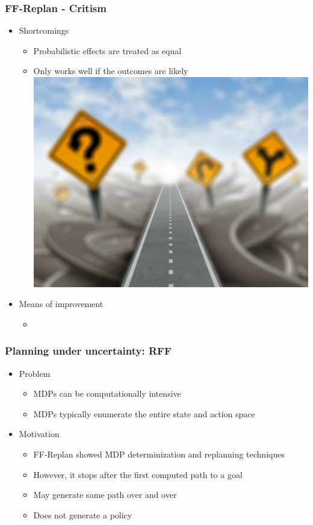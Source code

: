 \documentclass{beamer}
\let\origframetitle=\frametitle
\renewcommand\frametitle[1]{\origframetitle{\textbf{\large{\textrm{#1}}}}}
\begin{document}
\begin{frame}
  \frametitle{FF-Replan - Critism}

  \begin{itemize}
    \item Shortcomings
	\begin{itemize}
        	\item Probabilistic effects are treated as equal
	\item Only works well if the outcomes are likely
\includegraphics[scale=0.01]{images/direction-road-maze.jpg}
	\end{itemize}
   \item Means of improvement
	\begin{itemize}
	\item
	\end{itemize}
   \end{itemize}
\end{frame}

\begin{frame}
  \frametitle{Planning under uncertainty: RFF}

  \begin{itemize}
    \item Problem
      \begin{itemize}
        \item MDPs can be computationally intensive
        \item MDPs typically enumerate the entire state and action space
      \end{itemize}
    \item Motivation
      \begin{itemize}
        \item FF-Replan showed MDP determinization and replanning techniques
        \item However, it stops after the first computed path to a goal
        \item May generate same path over and over
        \item Does not generate a policy
      \end{itemize}
  \end{itemize}

\end{frame}
\end{document}
